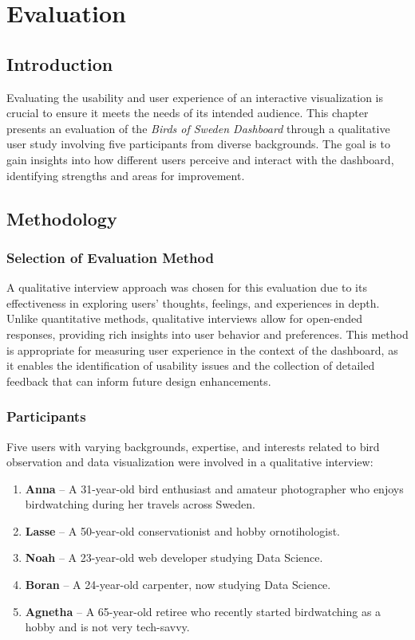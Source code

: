 \chapter{Evaluation}

\section{Introduction}

Evaluating the usability and user experience of an interactive visualization is crucial to ensure it meets the needs of its intended audience. This chapter presents an evaluation of the \textit{Birds of Sweden Dashboard} through a qualitative user study involving five participants from diverse backgrounds. The goal is to gain insights into how different users perceive and interact with the dashboard, identifying strengths and areas for improvement.

\section{Methodology}

\subsection{Selection of Evaluation Method}

A qualitative interview approach was chosen for this evaluation due to its effectiveness in exploring users' thoughts, feelings, and experiences in depth. Unlike quantitative methods, qualitative interviews allow for open-ended responses, providing rich insights into user behavior and preferences. This method is appropriate for measuring user experience in the context of the dashboard, as it enables the identification of usability issues and the collection of detailed feedback that can inform future design enhancements.

\subsection{Participants}

Five users with varying backgrounds, expertise, and interests related to bird observation and data visualization were involved in a qualitative interview:

\begin{enumerate} 
    \item \textbf{Anna} -- A 31-year-old bird enthusiast and amateur photographer who enjoys birdwatching during her travels across Sweden.
    \item \textbf{Lasse} -- A 50-year-old conservationist and hobby ornotihologist.
    \item \textbf{Noah} -- A 23-year-old web developer studying Data Science.
    \item \textbf{Boran} -- A 24-year-old carpenter, now studying Data Science.
    \item \textbf{Agnetha} -- A 65-year-old retiree who recently started birdwatching as a hobby and is not very tech-savvy.
\end{enumerate}

